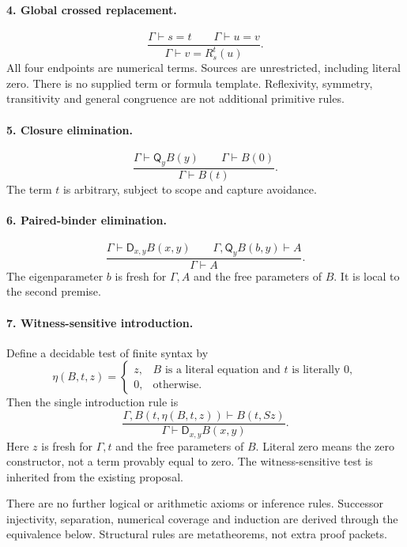 \documentclass[11pt,letterpaper]{article}
\theoremstyle{definition}
\theoremstyle{remark}
\newcommand{\D}{\mathsf D}
\newcommand{\Q}{\mathsf Q}
\newcommand{\Rep}[3]{R_{#1}^{#2}(#3)}
\begin{document}
\paragraph{4. Global crossed replacement.}
\[
 \frac{\Gamma\vdash s=t\qquad\Gamma\vdash u=v}
      {\Gamma\vdash v=\Rep{s}{t}{u}}. \tag{G}\label{new:grule}
\]
All four endpoints are numerical terms. Sources are unrestricted,
including literal zero. There is no supplied term or formula template.
Reflexivity, symmetry, transitivity and general congruence are not
additional primitive rules.

\paragraph{5. Closure elimination.}
\[
 \frac{\Gamma\vdash\Q_yB(y)\qquad\Gamma\vdash B(0)}
      {\Gamma\vdash B(t)}. \tag{QE}
\]
The term $t$ is arbitrary, subject to scope and capture avoidance.

\paragraph{6. Paired-binder elimination.}
\[
 \frac{\Gamma\vdash\D_{x,y}B(x,y)\qquad
       \Gamma,\Q_yB(b,y)\vdash A}
      {\Gamma\vdash A}. \tag{DE}
\]
The eigenparameter $b$ is fresh for $\Gamma,A$ and the free parameters of
$B$. It is local to the second premise.

\paragraph{7. Witness-sensitive introduction.}
Define a decidable test of finite syntax by
\[
 \eta(B,t,z)=
 \begin{cases}
 z,&\text{$B$ is a literal equation and $t$ is literally $0$},\\
 0,&\text{otherwise}.
 \end{cases}
\]
Then the single introduction rule is
\[
 \frac{\Gamma,B(t,\eta(B,t,z))\vdash B(t,Sz)}
      {\Gamma\vdash\D_{x,y}B(x,y)}. \tag{DI}
\]
Here $z$ is fresh for $\Gamma,t$ and the free parameters of $B$.
Literal zero means the zero constructor, not a term provably equal to
zero. The witness-sensitive test is inherited from the existing proposal.

There are no further logical or arithmetic axioms or inference rules.
Successor injectivity, separation, numerical coverage and induction are
derived through the equivalence below. Structural rules are metatheorems,
not extra proof packets.
\end{document}
